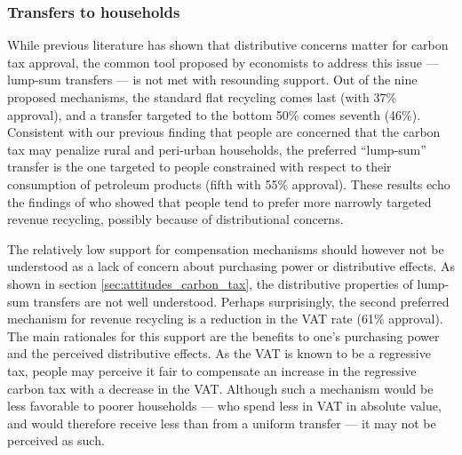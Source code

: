 \documentclass[english,5p,authoryear]{elsarticle}
\begin{document}
        \subsubsection{Transfers to households}
While previous literature has shown that distributive concerns matter for carbon tax approval, the common tool proposed by economists to address this issue --- lump-sum transfers --- is not met with resounding support. Out of the nine proposed mechanisms, the standard flat recycling comes last (with 37\% approval), and a transfer targeted to the bottom 50\% comes seventh (46\%). Consistent with our previous finding that people are concerned that the carbon tax may penalize rural and peri-urban households, the preferred ``lump-sum'' transfer is the one targeted to people constrained with respect to their consumption of petroleum products (fifth with 55\% approval). These results echo the findings of \citet{kallbekken_et_al_2011} who showed that people tend to prefer more narrowly targeted revenue recycling, possibly because of distributional concerns. %

The relatively low support for compensation mechanisms should however not be understood as a lack of concern about purchasing power or distributive effects. As shown in section \ref{sec:attitudes_carbon_tax}, the distributive properties of lump-sum transfers are not well understood. Perhaps surprisingly, the second preferred mechanism for revenue recycling is a reduction in the VAT rate (61\% approval). The main rationales for this support are the benefits to one's purchasing power and the perceived distributive effects. As the VAT is known to be a regressive tax, people may perceive it fair to compensate an increase in the regressive carbon tax with a decrease in the VAT. Although such a mechanism would be less favorable to poorer households --- who spend less in VAT in absolute value, and would therefore receive less than from a uniform transfer --- it may not be perceived as such. %

\end{document}

